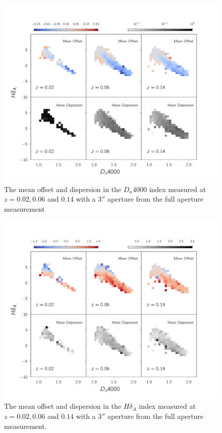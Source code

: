 \begin{figure}
\includegraphics[width=\textwidth]{figures/dn4000_full_aperture_comparisons.pdf}
\caption[The mean offset and dispersion in the $D_{n}4000$ index measured 
at $z = 0.02,0.06$ and $0.14$ with a $3''$ aperture from the full aperture measurement]{ 
The mean offset and dispersion in the $D_{n}4000$ index measured at 
$z = 0.02,0.06$ and $0.14$ with a $3''$ aperture from the full aperture measurement
\label{fig:offset_d4000}}
\end{figure}

\begin{figure}
\includegraphics[width=\textwidth]{figures/hdelta_full_aperture_comparisons.pdf}
\caption[The mean offset and dispersion in the $H\delta_{A}$
 index measured at $z = 0.02,0.06$ and $0.14$ with a $3''$ 
 aperture from the full aperture measurement ]
 {The mean offset and dispersion in the $H\delta_{A}$ 
 index measured at $z = 0.02,0.06$ and $0.14$ 
 with a $3''$ aperture from the full aperture measurement.
\label{fig:offset_hdelta}}
\end{figure}

